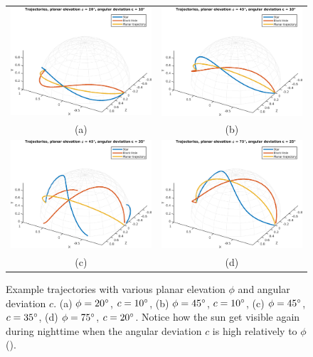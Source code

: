 \documentclass{report}
\begin{document}
\begin{figure}
  \centering
  \begin{tabular}{cc}
  \includegraphics[width=0.45\linewidth]{q4_trajectory_el20_dev10.png} &
  \includegraphics[width=0.45\linewidth]{q4_trajectory_el45_dev10.png} \\ \vspace{1em}
  (a) & (b) \\
  \includegraphics[width=0.45\linewidth]{q4_trajectory_el45_dev35.png} &
  \includegraphics[width=0.45\linewidth]{q4_trajectory_el75_dev25.png} \\
  (c) & (d)
  \end{tabular}
  \caption[Example trajectories]
   {Example trajectories with various planar elevation $\phi$ and angular deviation $c$. (a) $\phi = 20\degree$, $c = 10\degree$, (b) $\phi = 45\degree$, $c = 10\degree$, (c) $\phi = 45\degree$, $c = 35\degree$, (d) $\phi = 75\degree$, $c = 20\degree$. Notice how the sun get visible again during nighttime when the angular deviation $c$ is high relatively to $\phi$ ().}
  \label{q4:trajectories}
\end{figure}
\end{document}
